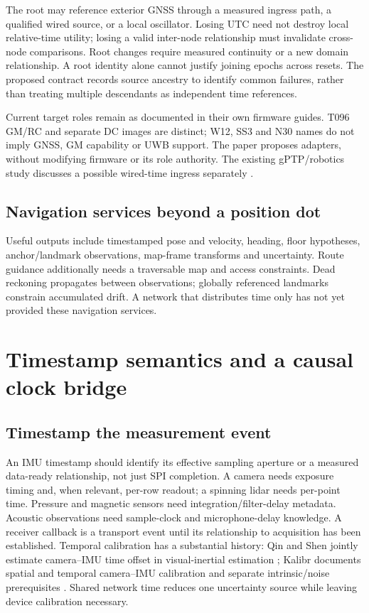 \documentclass[11pt,letterpaper]{article}
\begin{document}
The root may reference exterior GNSS through a measured ingress path, a qualified wired source, or a local oscillator. Losing UTC need not destroy local relative-time utility; losing a valid inter-node relationship must invalidate cross-node comparisons. Root changes require measured continuity or a new domain relationship. A root identity alone cannot justify joining epochs across resets. The proposed contract records source ancestry to identify common failures, rather than treating multiple descendants as independent time references.

Current target roles remain as documented in their own firmware guides. T096 GM/RC and separate DC images are distinct; W12, SS3 and N30 names do not imply GNSS, GM capability or UWB support. The paper proposes adapters, without modifying firmware or its role authority. The existing gPTP/robotics study discusses a possible wired-time ingress separately \cite{robotics}.

\subsection{Navigation services beyond a position dot}
Useful outputs include timestamped pose and velocity, heading, floor hypotheses, anchor/landmark observations, map-frame transforms and uncertainty. Route guidance additionally needs a traversable map and access constraints. Dead reckoning propagates between observations; globally referenced landmarks constrain accumulated drift. A network that distributes time only has not yet provided these navigation services.

\section{Timestamp semantics and a causal clock bridge}\label{sec:contract}
\subsection{Timestamp the measurement event}
An IMU timestamp should identify its effective sampling aperture or a measured data-ready relationship, not just SPI completion. A camera needs exposure timing and, when relevant, per-row readout; a spinning lidar needs per-point time. Pressure and magnetic sensors need integration/filter-delay metadata. Acoustic observations need sample-clock and microphone-delay knowledge. A receiver callback is a transport event until its relationship to acquisition has been established. Temporal calibration has a substantial history: Qin and Shen jointly estimate camera--IMU time offset in visual-inertial estimation \cite{qin}; Kalibr documents spatial and temporal camera--IMU calibration and separate intrinsic/noise prerequisites \cite{kalibr}. Shared network time reduces one uncertainty source while leaving device calibration necessary.
\end{document}
